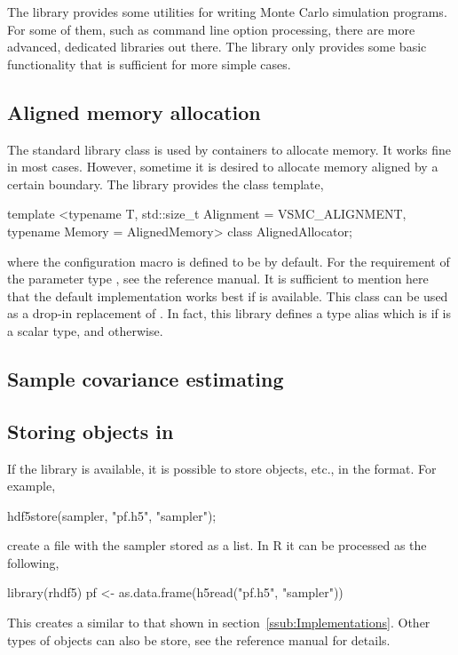 \documentclass[11pt,bib,mint,hyper,altcolor]{marticle}
\begin{document}
The library provides some utilities for writing Monte Carlo simulation
programs. For some of them, such as command line option processing, there are
more advanced, dedicated libraries out there. The library only provides some
basic functionality that is sufficient for more simple cases.

\subsection{Aligned memory allocation}
\label{sub:Aligned memory allocation}

The standard library class  is used by containers to
allocate memory. It works fine in most cases. However, sometime it is desired
to allocate memory aligned by a certain boundary. The library provides the
class template,
\begin{cppcode}
  template <typename T, std::size_t Alignment = VSMC_ALIGNMENT,
  typename Memory = AlignedMemory>
  class AlignedAllocator;
\end{cppcode}
where the configuration macro  is defined to be
 by default. For the requirement of the parameter type
, see the reference manual. It is sufficient to mention here
that the default implementation works best if \tbb is available. This class can
be used as a drop-in replacement of . In fact,
this library defines a type alias  which is
 if  is a scalar
type, and  otherwise.

\subsection{Sample covariance estimating}
\label{sub:Sample covariance estimating}

\subsection{Storing objects in \protect\hdf}
\label{sub:Storing objects in hdf}

If the \hdf library is available, it is possible to store
 objects, etc., in the \hdf format. For example,
\begin{cppcode}
  hdf5store(sampler, "pf.h5", "sampler");
\end{cppcode}
create a \hdf file with the sampler stored as a list. In R it can be processed
as the following,
\begin{rcode}
  library(rhdf5)
  pf <- as.data.frame(h5read("pf.h5", "sampler"))
\end{rcode}
This creates a  similar to that shown in
section~\ref{ssub:Implementations}. Other types of objects can also be store,
see the reference manual for details.
\end{document}
